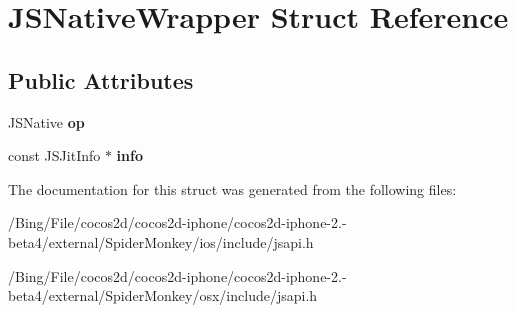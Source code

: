 \hypertarget{struct_j_s_native_wrapper}{\section{J\-S\-Native\-Wrapper Struct Reference}
\label{struct_j_s_native_wrapper}
}
\subsection*{Public Attributes}
\begin{DoxyCompactItemize}
\item 
\hypertarget{struct_j_s_native_wrapper_af4f07d97f03b7900eaa4d2987893c9f6}{J\-S\-Native {\bfseries op}}\label{struct_j_s_native_wrapper_af4f07d97f03b7900eaa4d2987893c9f6}

\item 
\hypertarget{struct_j_s_native_wrapper_ac315b2383d78e2a9c476e4d90dcc2c73}{const J\-S\-Jit\-Info $\ast$ {\bfseries info}}\label{struct_j_s_native_wrapper_ac315b2383d78e2a9c476e4d90dcc2c73}

\end{DoxyCompactItemize}


The documentation for this struct was generated from the following files\-:\begin{DoxyCompactItemize}
\item 
/\-Bing/\-File/cocos2d/cocos2d-\/iphone/cocos2d-\/iphone-\/2.-\/beta4/external/\-Spider\-Monkey/ios/include/jsapi.\-h\item 
/\-Bing/\-File/cocos2d/cocos2d-\/iphone/cocos2d-\/iphone-\/2.-\/beta4/external/\-Spider\-Monkey/osx/include/jsapi.\-h\end{DoxyCompactItemize}
